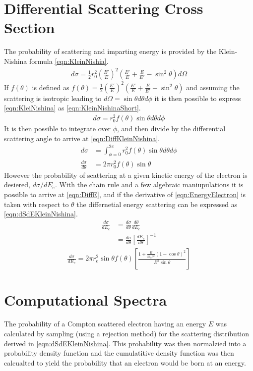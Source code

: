 \section{Differential Scattering Cross Section}
The probability of scattering and imparting energy is provided by the Klein-Nishina formula \eqref{eqn:KleinNishia}.
\begin{align}
  \label{eqn:KleinNishina}
  d\sigma = \frac{1}{2} r_0^2 \left(\frac{E'}{E}\right)^2 \left(\frac{E'}{E} + \frac{E}{E'}-\sin^2\theta\right)d\Omega
\end{align}
If $f(\theta)$ is defined as $f(\theta) = \frac{1}{2}\left(\frac{E'}{E}\right)^2 \left(\frac{E'}{E} + \frac{E}{E'}-\sin^2\theta\right)$ and assuming the scattering is isotropic leading to $d\Omega = \sin\theta d\theta d\phi$ it is then possible to express \eqref{eqn:KleiNishina} as \eqref{eqn:KleinNishinaShort}.
\begin{align}
  \label{eqn:KleinNishinaShort}
    d\sigma = r_0^2 f(\theta)\sin\theta d\theta d\phi
\end{align}
It is then possible to integrate over $\phi$, and then divide by the differential scattering angle to arrive at \eqref{eqn:DiffKleinNishina}.
\begin{align}
  \label{eqn:DiffKleinNishina}
  d\sigma &=\int_{\phi=0}^{2\pi} r_0^2 f(\theta)\sin\theta d\theta d\phi\\
  \frac{d\sigma}{d\theta} &=2\pi r_0^2 f(\theta)\sin\theta
\end{align}
However the probability of scattering at a given kinetic energy of the electron is desiered, $d\sigma/dE_e$.
With the chain rule and a few algebraic maniupulations it is possible to arrive at \eqref{eqn:DiffE}, and if the derivative of \eqref{eqn:EnergyElectron} is taken with respect to $\theta$ the differnetial energy scattering can be expressed as \eqref{eqn:dSdEKleinNishina}.
\begin{align}
  \label{eqn:DiffE}
  \frac{d\sigma}{dE_e} & = \frac{d\sigma}{d\theta} \frac{d\theta}{dE_e} \\
   & = \frac{d\sigma}{d\theta} \left[\frac{dE_e}{d\theta}\right]^{-1} 
\end{align}
\begin{align}
  \label{eqn:dSdEKleinNishina}
\frac{d\sigma}{dE_e} = 2\pi r_e^2 \sin \theta f(\theta)\left [ \frac{1+\frac{E}{m_e c^2}\left(1-\cos\theta \right)^2}{E^2 \sin \theta} \right ]
\end{align}

\section{Computational Spectra}
The probability of a Compton scattered electron having an energy $E$ was calculated by sampling (using a rejection method) for the scattering distribution derived in \autoref{eqn:dSdEKleinNishina}.
This probability was then normalzied into a probability density function and the cumulatitive density function was then calcualted to yield the probability that an electron would be born at an energy.


